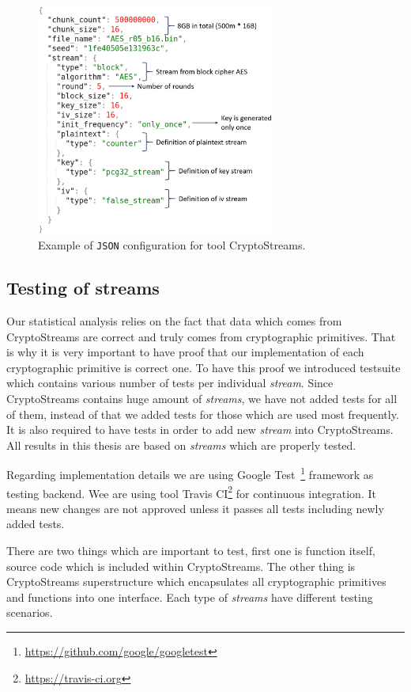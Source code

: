 \documentclass[
    digital,    %
    oneside,    %
    color,
    11pt,
    nocover,
    notable,
    nolof,
    nolot,
    final
]{fithesis3}
\begin{document}
\begin{figure}[h]
	\centering
	\includegraphics[width=0.7\textwidth]{./images/pictures/config.png}
	\caption{Example of \texttt{JSON} configuration for tool CryptoStreams.}
	\label{fig:json-example}
\end{figure}


\subsection{Testing of streams}

Our statistical analysis relies on the fact that data which comes from CryptoStreams are correct and truly comes from cryptographic primitives. That is why it is very important to have proof that our implementation of each cryptographic primitive is correct one. To have this proof we introduced testsuite which contains various number of tests per individual \textit{stream}. Since CryptoStreams contains huge amount of \textit{streams}, we have not added tests for all of them, instead of that we added tests for those which are used most frequently. It is also required to have tests in order to add new \textit{stream} into CryptoStreams. All results in this thesis are based on \textit{streams} which are properly tested.

Regarding implementation details we are using Google Test~\footnote{\url{https://github.com/google/googletest}} framework as testing backend. Wee are using tool Travis CI\footnote{\url{https://travis-ci.org}} for continuous integration. It means new changes are not approved unless it passes all tests including newly added tests. 

There are two things which are important to test, first one is function itself, source code which is included within CryptoStreams. The other thing is CryptoStreams superstructure which encapsulates all cryptographic primitives and functions into one interface. Each type of \textit{streams} have different testing scenarios.
\end{document}
